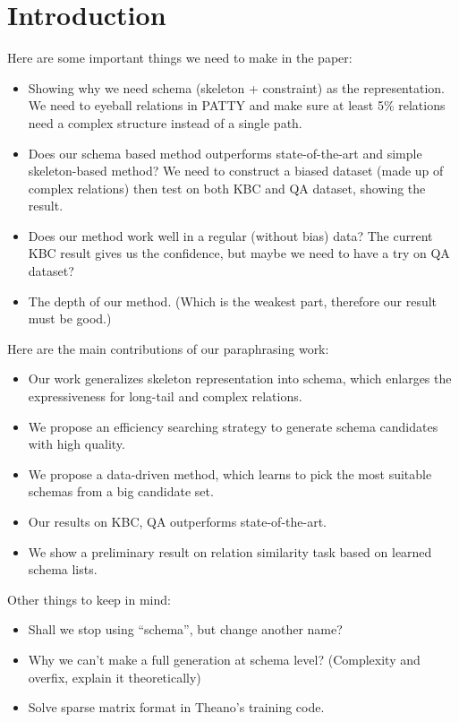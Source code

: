 \section{Introduction}
\label{sec:intro}

Here are some important things we need to make in the paper:
\begin{itemize}
  \item Showing why we need schema (skeleton + constraint) as 
        the representation. We need to eyeball relations in PATTY
		and make sure at least 5\% relations need a complex structure
		instead of a single path.
  \item Does our schema based method outperforms state-of-the-art and
        simple skeleton-based method? We need to construct a biased
		dataset (made up of complex relations) then test on both KBC
		and QA dataset, showing the result.
  \item Does our method work well in a regular (without bias) data?
        The current KBC result gives us the confidence, but maybe
		we need to have a try on QA dataset?
  \item The depth of our method. (Which is the weakest part, therefore
        our result must be good.)
\end{itemize}

Here are the main contributions of our paraphrasing work:
\begin{itemize}
  \item Our work generalizes skeleton representation into schema, 
        which enlarges the expressiveness for long-tail and complex
		relations.
  \item We propose an efficiency searching strategy to generate
        schema candidates with high quality.
  \item We propose a data-driven method, which learns to pick the 
        most suitable schemas from a big candidate set.
  \item Our results on KBC, QA outperforms state-of-the-art.
  \item We show a preliminary result on relation similarity task
        based on learned schema lists.
\end{itemize}

Other things to keep in mind:
\begin{itemize}
  \item Shall we stop using ``schema'', but change another name?
  \item Why we can't make a full generation at schema level? 
        (Complexity and overfix, explain it theoretically)
  \item Solve sparse matrix format in Theano's training code.
\end{itemize}


